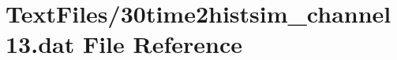 \hypertarget{30time2histsim__channel13_8dat}{}\section{Text\+Files/30time2histsim\+\_\+channel13.dat File Reference}
\label{30time2histsim__channel13_8dat}
